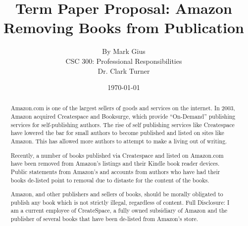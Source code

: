 \documentclass[12pt]{article}
\begin{document}
\title{\vfill Term Paper Proposal: Amazon Removing Books from Publication} %
\author{
 By Mark Gius \vspace{10pt} \\ 
CSC 300: Professional Responsibilities  \vspace{10pt} \\ 
Dr. Clark Turner \vspace{10pt} \\ 
}
\date{\today}

\maketitle

\vfill  %
\begin{abstract}
Amazon.com is one of the largest sellers of goods and services on the internet.  In 2003, Amazon acquired Createspace and Booksurge, which provide ``On-Demand'' publishing services for self-publishing authors. The rise of self publishing services like Createspace have lowered the bar for small authors to become published and listed on sites like Amazon. This has allowed more authors to attempt to make a living out of writing.

Recently, a number of books published via Createspace and listed on Amazon.com have been removed from Amazon's listings and their Kindle book reader devices.  Public statements from Amazon's and accounts from authors who have had their books de-listed point to removal due to distaste for the content of the books. 

Amazon, and other publishers and sellers of books, should be morally obligated to publish any book which is not strictly illegal, regardless of content.
\vfill
Full Disclosure: I am a current employee of CreateSpace, a fully owned subsidiary of Amazon and the publisher of several books that have been de-listed from Amazon's store.
\end{abstract}

\thispagestyle{empty} %
\newpage


\end{document}
